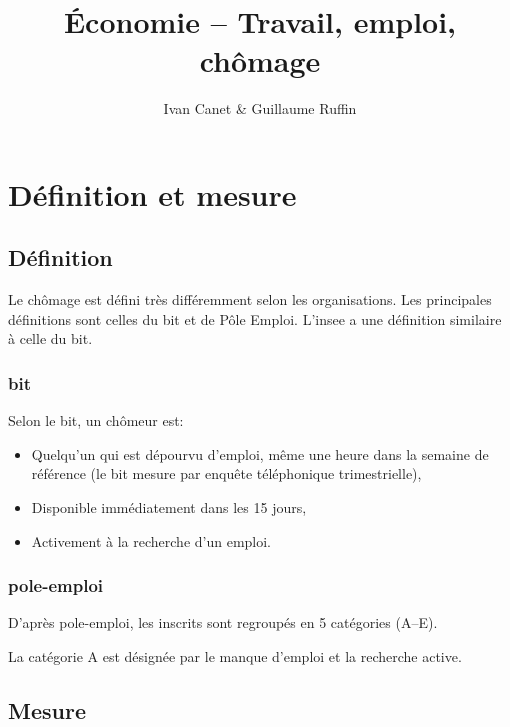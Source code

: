 \documentclass[10pt,a4paper,french]{article}
\begin{document}
\title{Économie -- Travail, emploi, chômage}
\author{Ivan Canet \& Guillaume Ruffin}
\maketitle


\tableofcontents

\section{Définition et mesure}

\subsection{Définition}
Le chômage est défini très différemment selon les organisations. Les principales définitions sont celles du \gls{bit} et de Pôle Emploi. L'\gls{insee} a une définition similaire à celle du \gls{bit}.

\subsubsection{\glsdesc{bit}}
Selon le \gls{bit}, un chômeur est:
\begin{itemize}
\item Quelqu'un qui est dépourvu d'emploi, même une heure dans la semaine de référence (le \gls{bit} mesure par enquête téléphonique trimestrielle),
\item Disponible immédiatement dans les 15 jours,
\item Activement à la recherche d'un emploi.
\end{itemize}

\subsubsection{\gls{pole-emploi}}
D'après \gls{pole-emploi}, les inscrits sont regroupés en 5 catégories (A--E).

La catégorie A est désignée par le manque d'emploi et la recherche active.

\subsection{Mesure}
\end{document}
